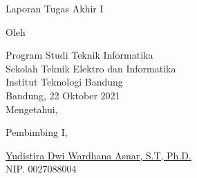 \clearpage
\pagestyle{empty}

\begin{center}
    \smallskip

    \Large \bfseries \MakeUppercase{\thetitle}
    \vfill

    \Large Laporan Tugas Akhir I
    \vfill

    \large Oleh

    \Large \theauthor

    \large Program Studi Teknik Informatika \\

    \normalsize \normalfont
    Sekolah Teknik Elektro dan Informatika \\
    Institut Teknologi Bandung \\

    \vfill
    \normalsize \normalfont
    Bandung, 22 Oktober 2021 \\
    Mengetahui,

    \vspace{0.5cm}
    Pembimbing I,

    \vfill
    \underline{Yudistira Dwi Wardhana Asnar, S.T, Ph.D.} \\
    NIP. 0027088004

\end{center}
\clearpage
